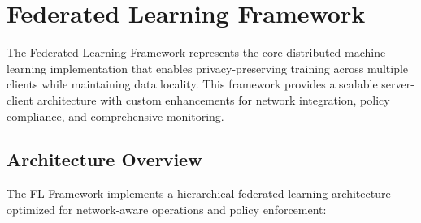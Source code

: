 \section{Federated Learning Framework}
\label{sec:fl-framework}

The Federated Learning Framework represents the core distributed machine learning implementation that enables privacy-preserving training across multiple clients while maintaining data locality. This framework provides a scalable server-client architecture with custom enhancements for network integration, policy compliance, and comprehensive monitoring.

\subsection{Architecture Overview}

The FL Framework implements a hierarchical federated learning architecture optimized for network-aware operations and policy enforcement:

